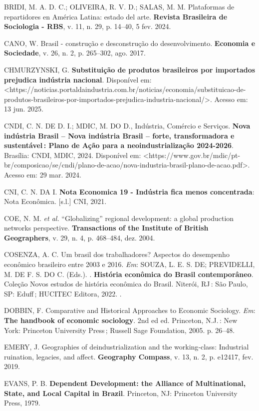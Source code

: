 BRIDI, M. A. D. C.; OLIVEIRA, R. V. D.; SALAS, M. M. Plataformas de
repartidores en América Latina: estado del arte. \textbf{Revista
Brasileira de Sociologia - RBS}, v. 11, n. 29, p. 14--40, 5 fev. 2024.

CANO, W. Brasil - construção e desconstrução do desenvolvimento.
\textbf{Economia e Sociedade}, v. 26, n. 2, p. 265--302, ago. 2017.

CHMURZYNSKI, G. \textbf{Substituição de produtos brasileiros por
importados prejudica indústria nacional}. Disponível em:
\textless https://noticias.portaldaindustria.com.br/noticias/economia/substituicao-de-produtos-brasileiros-por-importados-prejudica-industria-nacional/\textgreater.
Acesso em: 13 jun. 2025.

CNDI, C. N. DE D. I.; MDIC, M. DO D., Indústria, Comércio e Serviços.
\textbf{Nova indústria Brasil -- Nova indústria Brasil -- forte,
transformadora e sustentável\,: Plano de Ação para a neoindustrialização
2024-2026}. Brasília: CNDI, MDIC, 2024. Disponível em:
\textless https://www.gov.br/mdic/pt-br/composicao/se/cndi/plano-de-acao/nova-industria-brasil-plano-de-acao.pdf\textgreater.
Acesso em: 29 mar. 2024.

CNI, C. N. DA I. \textbf{Nota Economica 19 - Indústria fica menos
concentrada}: Nota Econômica. {[}s.l.{]} CNI, 2021.

COE, N. M. \emph{et al.} ``Globalizing'' regional development: a global
production networks perspective. \textbf{Transactions of the Institute
of British Geographers}, v. 29, n. 4, p. 468--484, dez. 2004.

COSENZA, A. C. Um brasil dos trabalhadores? Aspectos do desempenho
econômico brasileiro entre 2003 e 2016. \emph{Em}: SOUZA, L. E. S. DE;
PREVIDELLI, M. DE F. S. DO C. (Eds.). . \textbf{História econômica do
Brasil contemporâneo}. Coleção Novos estudos de história econômica do
Brasil. Niterói, RJ\,: São Paulo, SP: Eduff\,; HUCITEC Editora, 2022. .

DOBBIN, F. Comparative and Historical Approaches to Economic Sociology.
\emph{Em}: \textbf{The handbook of economic sociology}. 2nd ed ed.
Princeton, N.J.\,: New York: Princeton University Press\,; Russell Sage
Foundation, 2005. p. 26--48.

EMERY, J. Geographies of deindustrialization and the working‐class:
Industrial ruination, legacies, and affect. \textbf{Geography Compass},
v. 13, n. 2, p. e12417, fev. 2019.

EVANS, P. B. \textbf{Dependent Development: the Alliance of
Multinational, State, and Local Capital in Brazil}. Princeton, NJ:
Princeton University Press, 1979.

